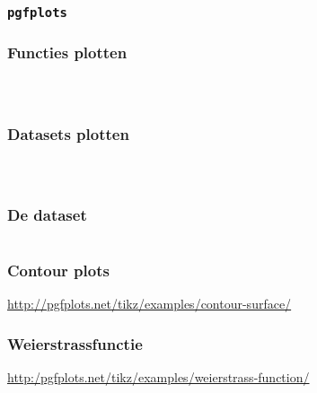 \begin{frame}
  \frametitle{\texttt{pgfplots}}

\end{frame}

\begin{frame}
  \frametitle{Functies plotten}

  \begin{columns}
    \begin{column}{.4\textwidth}
      \inputminted[fontsize = \scriptsize]{latex}{tikz/pgfplots/parabola.tikz}
    \end{column}
    \begin{column}{.6\textwidth}
      
    \end{column}
  \end{columns}
\end{frame}

\begin{frame}
  \frametitle{Datasets plotten}

  \begin{columns}
    \begin{column}{.4\textwidth}
      \inputminted[fontsize = \scriptsize]{latex}{tikz/pgfplots/external.tikz}
    \end{column}
    \begin{column}{.6\textwidth}
      
    \end{column}
  \end{columns}
\end{frame}

\begin{frame}
  \frametitle{De dataset}

  \inputminted[lastline = 10]{latex}{tikz/pgfplots/data.dat}
\end{frame}

\begin{frame}
  \frametitle{Contour plots}

  \centering
  

  \small\url{http://pgfplots.net/tikz/examples/contour-surface/}
\end{frame}

\begin{frame}
  \frametitle{Weierstrassfunctie}

  \centering
  

  \small\url{http:/pgfplots.net/tikz/examples/weierstrass-function/}
\end{frame}

